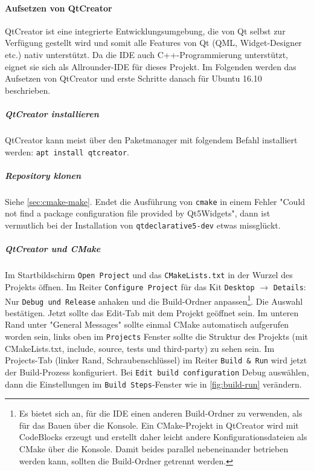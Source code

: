 
\paragraph{Aufsetzen von QtCreator}
\label{para:setup-qtcreator}

QtCreator ist eine integrierte Entwicklungsumgebung, die von Qt selbst zur
Verfügung gestellt wird und somit alle Features von Qt (QML, Widget-Designer
etc.) nativ unterstützt. Da die IDE auch C++-Programmierung unterstützt, eignet
sie sich als Allrounder-IDE für dieses Projekt. Im Folgenden werden das
Aufsetzen von QtCreator und erste Schritte danach für Ubuntu 16.10 beschrieben.

\subparagraph{QtCreator installieren}

QtCreator kann meist über den Paketmanager mit folgendem Befahl installiert werden: \texttt{apt install qtcreator}.

\subparagraph{Repository klonen}

Siehe \autoref{sec:cmake-make}. Endet die Ausführung von \texttt{cmake}
in einem Fehler "Could not find a package configuration file provided by
Qt5Widgets", dann ist vermutlich bei der Installation von
\texttt{qtdeclarative5-dev} etwas missglückt.

\subparagraph{QtCreator und CMake}

Im Startbildschirm \texttt{Open Project} und das \texttt{CMakeLists.txt} in der
Wurzel des Projekts öffnen. Im Reiter \texttt{Configure Project} für das Kit
\texttt{Desktop} $\rightarrow$ \texttt{Details}: Nur \texttt{Debug und Release}
anhaken und die Build-Ordner anpassen\footnote{Es bietet sich an, für die IDE
einen anderen Build-Ordner zu verwenden, als für das Bauen über die Konsole. Ein
CMake-Projekt in QtCreator wird mit CodeBlocks erzeugt und erstellt daher leicht
andere Konfigurationsdateien als CMake über die Konsole. Damit beides parallel
nebeneinander betrieben werden kann, sollten die Build-Ordner getrennt werden.}.
Die Auswahl bestätigen. Jetzt sollte das Edit-Tab mit dem Projekt geöffnet sein.
Im unteren Rand unter "General Messages" sollte einmal CMake automatisch
aufgerufen worden sein, links oben im \texttt{Projects} Fenster sollte die
Struktur des Projekts (mit CMakeLists.txt, include, source, tests und
third-party) zu sehen sein. Im Projects-Tab (linker Rand, Schraubenschlüssel) im
Reiter \texttt{Build \& Run} wird jetzt der Build-Prozess konfiguriert. Bei
\texttt{Edit build configuration} Debug auswählen, dann die Einstellungen im
\texttt{Build Steps}-Fenster wie in \autoref{fig:build-run} verändern.

